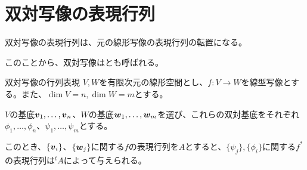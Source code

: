 \documentclass[../../../topic_linear-algebra]{subfiles}
\begin{document}
\sectionline
\section{双対写像の表現行列}

双対写像の表現行列は、元の線形写像の表現行列の転置になる。

このことから、双対写像はとも呼ばれる。

\begin{theorem*}{双対写像の行列表現}
  $V,W$を有限次元の線形空間とし、$f\colon V \to W$を線型写像とする。また、$\dim V = n, \dim W = m$とする。
  
  $V$の基底$\vb*{v}_1,\ldots,\vb*{v}_n$、$W$の基底$\vb*{w}_1, \ldots, \vb*{w}_m$を選び、これらの双対基底をそれぞれ$\phi_1, \ldots, \phi_n$、$\psi_1, \ldots, \psi_m$とする。

  このとき、$\{\vb*{v}_i \}$、$\{ \vb*{w}_j\}$に関する$f$の表現行列を$A$とすると、$\{ \psi_j \}, \{ \phi_i \}$に関する$f^*$の表現行列は${}^tA$によって与えられる。
\end{theorem*}
\end{document}
